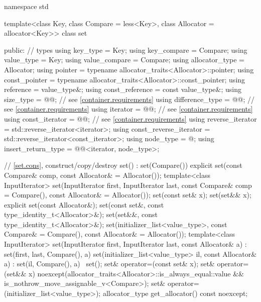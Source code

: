 \begin{codeblock}
namespace std {
  template<class Key, class Compare = less<Key>,
           class Allocator = allocator<Key>>
  class set {
  public:
    // types
    using key_type               = Key;
    using key_compare            = Compare;
    using value_type             = Key;
    using value_compare          = Compare;
    using allocator_type         = Allocator;
    using pointer                = typename allocator_traits<Allocator>::pointer;
    using const_pointer          = typename allocator_traits<Allocator>::const_pointer;
    using reference              = value_type&;
    using const_reference        = const value_type&;
    using size_type              = @@; // see \ref{container.requirements}
    using difference_type        = @@; // see \ref{container.requirements}
    using iterator               = @@; // see \ref{container.requirements}
    using const_iterator         = @@; // see \ref{container.requirements}
    using reverse_iterator       = std::reverse_iterator<iterator>;
    using const_reverse_iterator = std::reverse_iterator<const_iterator>;
    using node_type              = @\unspec@;
    using insert_return_type     = @@<iterator, node_type>;

    // \ref{set.cons}, construct/copy/destroy
    set() : set(Compare()) { }
    explicit set(const Compare& comp, const Allocator& = Allocator());
    template<class InputIterator>
      set(InputIterator first, InputIterator last,
          const Compare& comp = Compare(), const Allocator& = Allocator());
    set(const set& x);
    set(set&& x);
    explicit set(const Allocator&);
    set(const set&, const type_identity_t<Allocator>&);
    set(set&&, const type_identity_t<Allocator>&);
    set(initializer_list<value_type>, const Compare& = Compare(),
        const Allocator& = Allocator());
    template<class InputIterator>
      set(InputIterator first, InputIterator last, const Allocator& a)
        : set(first, last, Compare(), a) { }
    set(initializer_list<value_type> il, const Allocator& a)
      : set(il, Compare(), a) { }
    ~set();
    set& operator=(const set& x);
    set& operator=(set&& x)
      noexcept(allocator_traits<Allocator>::is_always_equal::value &&
               is_nothrow_move_assignable_v<Compare>);
    set& operator=(initializer_list<value_type>);
    allocator_type get_allocator() const noexcept;

}}
\end{codeblock}
